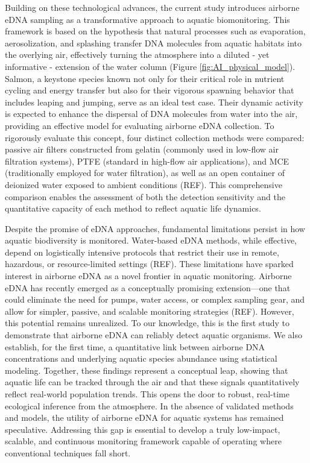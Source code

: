 \documentclass{article}
\begin{document}
Building on these technological advances, the current study introduces airborne eDNA sampling as a transformative approach to aquatic biomonitoring. This framework is based on the hypothesis that natural processes such as evaporation, aerosolization, and splashing transfer DNA molecules from aquatic habitats into the overlying air, effectively turning the atmosphere into a diluted - yet informative - extension of the water column (Figure \ref{fig:AI_physical_model}). Salmon, a keystone species known not only for their critical role in nutrient cycling and energy transfer but also for their vigorous spawning behavior that includes leaping and jumping, serve as an ideal test case. Their dynamic activity is expected to enhance the dispersal of DNA molecules from water into the air, providing an effective model for evaluating airborne eDNA collection. To rigorously evaluate this concept, four distinct collection methods were compared: passive air filters constructed from gelatin (commonly used in low-flow air filtration systems), PTFE (standard in high-flow air applications), and MCE (traditionally employed for water filtration), as well as an open container of deionized water exposed to ambient conditions (REF). This comprehensive comparison enables the assessment of both the detection sensitivity and the quantitative capacity of each method to reflect aquatic life dynamics.

Despite the promise of eDNA approaches, fundamental limitations persist in how aquatic biodiversity is monitored. Water-based eDNA methods, while effective, depend on logistically intensive protocols that restrict their use in remote, hazardous, or resource-limited settings (REF). These limitations have sparked interest in airborne eDNA as a novel frontier in aquatic monitoring. Airborne eDNA has recently emerged as a conceptually promising extension—one that could eliminate the need for pumps, water access, or complex sampling gear, and allow for simpler, passive, and scalable monitoring strategies (REF). However, this potential remains unrealized. To our knowledge, this is the first study to demonstrate that airborne eDNA can reliably detect aquatic organisms. We also establish, for the first time, a quantitative link between airborne DNA concentrations and underlying aquatic species abundance using statistical modeling. Together, these findings represent a conceptual leap, showing that aquatic life can be tracked through the air and that these signals quantitatively reflect real-world population trends. This opens the door to robust, real-time ecological inference from the atmosphere. In the absence of validated methods and models, the utility of airborne eDNA for aquatic systems has remained speculative. Addressing this gap is essential to develop a truly low-impact, scalable, and continuous monitoring framework capable of operating where conventional techniques fall short.
\end{document}
